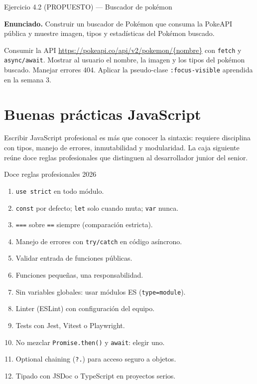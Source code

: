 \documentclass[11pt,a4paper,openany]{book}
\begin{document}
\begin{cajaejercicio}{Ejercicio 4.2 (PROPUESTO) --- Buscador de pokémon}


\textbf{Enunciado.} Construir un buscador de Pokémon que consuma la PokeAPI pública y muestre imagen, tipos y estadísticas del Pokémon buscado.

Consumir la API \url{https://pokeapi.co/api/v2/pokemon/\{nombre\}} con
\texttt{fetch} y \texttt{async/await}. Mostrar al usuario el nombre,
la imagen y los tipos del pokémon buscado. Manejar errores 404.
Aplicar la pseudo-clase \texttt{:focus-visible} aprendida en la
semana 3.
\end{cajaejercicio}

\section{Buenas prácticas JavaScript}

Escribir JavaScript profesional es más que conocer la
sintaxis: requiere disciplina con tipos, manejo de errores,
inmutabilidad y modularidad. La caja siguiente reúne doce reglas
profesionales que distinguen al desarrollador junior del senior.


\begin{cajabuenas}{Doce reglas profesionales 2026}
\begin{enumerate}
\item \texttt{use strict} en todo módulo.
\item \texttt{const} por defecto; \texttt{let} solo cuando muta;
\texttt{var} nunca.
\item \texttt{===} sobre \texttt{==} siempre (comparación estricta).
\item Manejo de errores con \texttt{try/catch} en código asíncrono.
\item Validar entrada de funciones públicas.
\item Funciones pequeñas, una responsabilidad.
\item Sin variables globales: usar módulos ES (\texttt{type=module}).
\item Linter (ESLint) con configuración del equipo.
\item Tests con Jest, Vitest o Playwright.
\item No mezclar \texttt{Promise.then()} y \texttt{await}: elegir uno.
\item Optional chaining (\texttt{?.}) para acceso seguro a objetos.
\item Tipado con JSDoc o TypeScript en proyectos serios.
\end{enumerate}
\end{cajabuenas}
\end{document}

